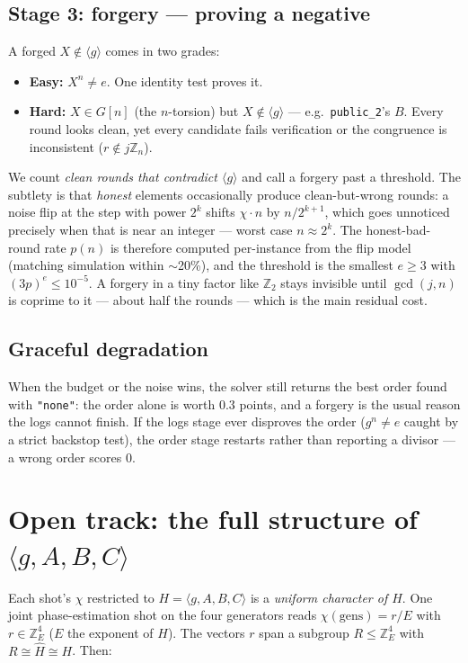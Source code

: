 \documentclass[11pt]{article}
\newcommand{\Z}{\mathbb{Z}}
\theoremstyle{plain}
\theoremstyle{definition}
\begin{document}
\subsection{Stage 3: forgery --- proving a negative}

A forged $X\notin\langle g\rangle$ comes in two grades:

\begin{itemize}[nosep]
  \item \textbf{Easy:} $X^n\ne e$. One identity test proves it.
  \item \textbf{Hard:} $X\in G[n]$ (the $n$-torsion) but
        $X\notin\langle g\rangle$ --- e.g.\ \texttt{public\_2}'s $B$.
        Every round looks clean, yet every candidate fails verification
        or the congruence is inconsistent ($r\notin j\Z_n$).
\end{itemize}

We count \emph{clean rounds that contradict $\langle g\rangle$} and call a
forgery past a threshold. The subtlety is that \emph{honest} elements
occasionally produce clean-but-wrong rounds: a noise flip at the step
with power $2^k$ shifts $\chi\cdot n$ by $n/2^{k+1}$, which goes
unnoticed precisely when that is near an integer --- worst case
$n\approx 2^k$. The honest-bad-round rate $p(n)$ is therefore computed
per-instance from the flip model (matching simulation within $\sim$20\%),
and the threshold is the smallest $e\ge3$ with $(3p)^e\le10^{-5}$.
A forgery in a tiny factor like $\Z_2$ stays invisible until
$\gcd(j,n)$ is coprime to it --- about half the rounds --- which is the
main residual cost.

\subsection{Graceful degradation}

When the budget or the noise wins, the solver still returns the best
order found with \texttt{"none"}: the order alone is worth 0.3 points,
and a forgery is the usual reason the logs cannot finish. If the logs
stage ever disproves the order ($g^n\ne e$ caught by a strict backstop
test), the order stage restarts rather than reporting a divisor ---
a wrong order scores 0.

\section{Open track: the full structure of $\langle g,A,B,C\rangle$}

Each shot's $\chi$ restricted to $H=\langle g,A,B,C\rangle$ is a
\emph{uniform character of $H$}. One joint phase-estimation shot on the
four generators reads $\chi(\mathrm{gens})=r/E$ with $r\in\Z_E^4$
($E$ the exponent of $H$). The vectors $r$ span a subgroup
$R\le\Z_E^4$ with $R\cong\widehat H\cong H$. Then:
\end{document}
